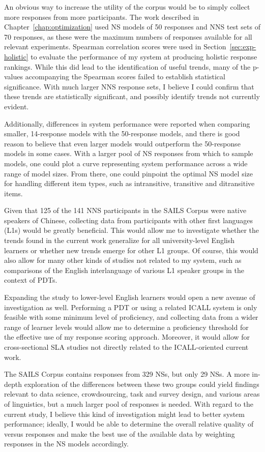 An obvious way to increase the utility of the corpus would be to simply collect more responses from more participants. The work described in Chapter~\ref{chap:optimization} used NS models of 50 responses and NNS test sets of 70 responses, as these were the maximum numbers of responses available for all relevant experiments. Spearman correlation scores were used in Section~\ref{sec:exp-holistic} to evaluate the performance of my system at producing holistic response rankings. While this did lead to the identification of useful trends, many of the p-values accompanying the Spearman scores failed to establish statistical significance. With much larger NNS response sets, I believe I could confirm that these trends are statistically significant, and possibly identify trends not currently evident.

Additionally, differences in system performance were reported when comparing smaller, 14-response models with the 50-response models, and there is good reason to believe that even larger models would outperform the 50-response models in some cases. With a larger pool of NS responses from which to sample models, one could plot a curve representing system performance across a wide range of model sizes. From there, one could pinpoint the optimal NS model size for handling different item types, such as intransitive, transitive and ditransitive items.

Given that 125 of the 141 NNS participants in the SAILS Corpus were native speakers of Chinese, collecting data from participants with other first languages (L1s) would be greatly beneficial. This would allow me to investigate whether the trends found in the current work generalize for all university-level English learners or whether new trends emerge for other L1 groups. Of course, this would also allow for many other kinds of studies not related to my system, such as comparisons of the English interlanguage of various L1 speaker groups in the context of PDTs.

Expanding the study to lower-level English learners would open a new avenue of investigation as well. Performing a PDT or using a related ICALL system is only feasible with some minimum level of proficiency, and collecting data from a wider range of learner levels would allow me to determine a proficiency threshold for the effective use of my response scoring approach. Moreover, it would allow for cross-sectional SLA studies not directly related to the ICALL-oriented current work.

The SAILS Corpus contains responses from 329  NSs, but only 29  NSs. A more in-depth exploration of the differences between these two groups could yield findings relevant to data science, crowdsourcing, task and survey design, and various areas of linguistics, but a much larger pool of  responses is needed. With regard to the current study, I believe this kind of investigation might lead to better system performance; ideally, I would be able to determine the overall relative quality of  versus  responses and make the best use of the available data by weighting responses in the NS models accordingly.

